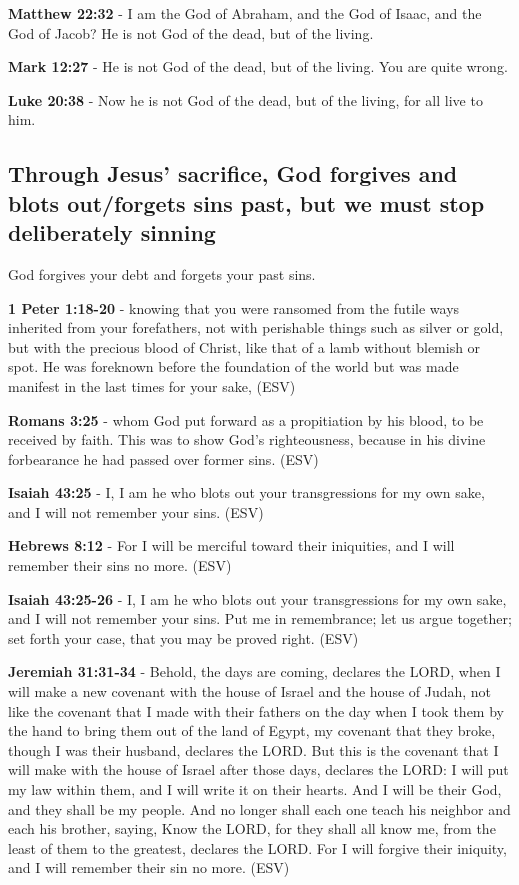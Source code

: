 \documentclass[11pt]{article}
\begin{document}
\textbf{Matthew 22:32} - I am the God of Abraham, and the God of Isaac, and the God of Jacob? He is not God of the dead, but of the living.

\textbf{Mark 12:27} - He is not God of the dead, but of the living. You are quite wrong.

\textbf{Luke 20:38} - Now he is not God of the dead, but of the living, for all live to him.

\subsection{Through Jesus' sacrifice, God forgives and blots out/forgets sins past, but we must stop deliberately sinning}
\label{sec:orgf7cdbc2}
God forgives your debt and forgets your past sins.

\textbf{1 Peter 1:18-20} - knowing that you were ransomed from the futile ways inherited from your forefathers, not with perishable things such as silver or gold, but with the precious blood of Christ, like that of a lamb without blemish or spot. He was foreknown before the foundation of the world but was made manifest in the last times for your sake, (ESV)

\textbf{Romans 3:25} -  whom God put forward as a propitiation by his blood, to be received by faith.  This was to show God's righteousness, because in his divine forbearance he had passed over former sins.  (ESV)

\textbf{Isaiah 43:25} -  I, I am he who blots out your transgressions for my own sake, and I will not remember your sins.  (ESV)

\textbf{Hebrews 8:12} -  For I will be merciful toward their iniquities, and I will remember their sins no more.  (ESV)

\textbf{Isaiah 43:25-26} -  I, I am he who blots out your transgressions for my own sake, and I will not remember your sins.  Put me in remembrance; let us argue together; set forth your case, that you may be proved right.  (ESV)

\textbf{Jeremiah 31:31-34} -  Behold, the days are coming, declares the LORD, when I will make a new covenant with the house of Israel and the house of Judah, not like the covenant that I made with their fathers on the day when I took them by the hand to bring them out of the land of Egypt, my covenant that they broke, though I was their husband, declares the LORD.  But this is the covenant that I will make with the house of Israel after those days, declares the LORD: I will put my law within them, and I will write it on their hearts.  And I will be their God, and they shall be my people.  And no longer shall each one teach his neighbor and each his brother, saying, Know the LORD, for they shall all know me, from the least of them to the greatest, declares the LORD.  For I will forgive their iniquity, and I will remember their sin no more.  (ESV)
\end{document}
